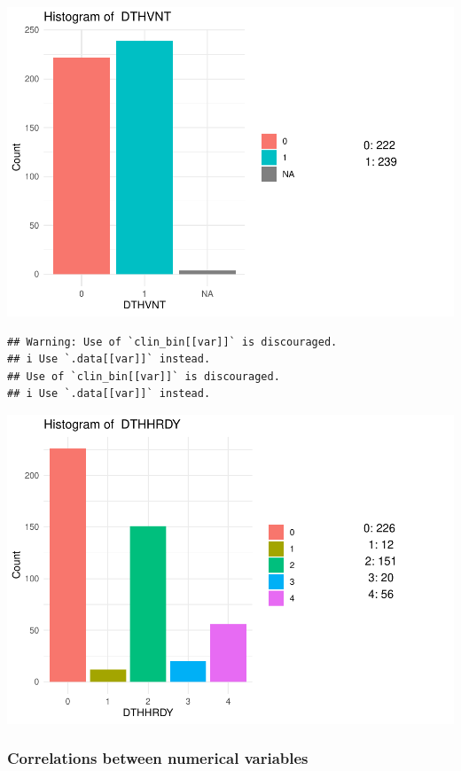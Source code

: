 \documentclass[
]{article}
\begin{document}
\includegraphics{Q1_markdown_files/figure-latex/unnamed-chunk-5-3.pdf}

\begin{verbatim}
## Warning: Use of `clin_bin[[var]]` is discouraged.
## i Use `.data[[var]]` instead.
## Use of `clin_bin[[var]]` is discouraged.
## i Use `.data[[var]]` instead.
\end{verbatim}

\includegraphics{Q1_markdown_files/figure-latex/unnamed-chunk-5-4.pdf}

\hypertarget{correlations-between-numerical-variables}{%
\subsubsection{Correlations between numerical
variables}\label{correlations-between-numerical-variables}}
\end{document}
